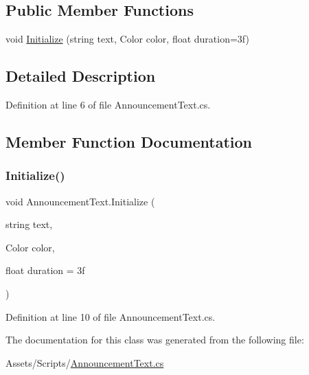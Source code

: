 \subsection*{Public Member Functions}
\begin{DoxyCompactItemize}
\item 
void \mbox{\hyperlink{class_announcement_text_a73025e6ac4349a61de65728eb1c926f9}{Initialize}} (string text, Color color, float duration=3f)
\end{DoxyCompactItemize}


\subsection{Detailed Description}


Definition at line 6 of file Announcement\+Text.\+cs.



\subsection{Member Function Documentation}
\mbox{\label{class_announcement_text_a73025e6ac4349a61de65728eb1c926f9}} 
\subsubsection{\texorpdfstring{Initialize()}{Initialize()}}
{\footnotesize\ttfamily void Announcement\+Text.\+Initialize (\begin{DoxyParamCaption}\item[{string}]{text,  }\item[{Color}]{color,  }\item[{float}]{duration = {\ttfamily 3f} }\end{DoxyParamCaption})}



Definition at line 10 of file Announcement\+Text.\+cs.



The documentation for this class was generated from the following file\+:\begin{DoxyCompactItemize}
\item 
Assets/\+Scripts/\mbox{\hyperlink{_announcement_text_8cs}{Announcement\+Text.\+cs}}\end{DoxyCompactItemize}
